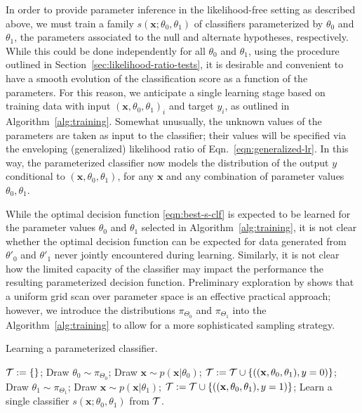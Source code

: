 \documentclass[12pt]{article}
\numberwithin{equation}{section}
\theoremstyle{plain}
\begin{document}
In order to provide parameter inference in the likelihood-free setting as
described above, we must train a family $s(\mathbf{x};\theta_0,\theta_1)$ of
classifiers parameterized by $\theta_0$ and $\theta_1$, the parameters
associated to the null and alternate hypotheses, respectively. While this could
be done independently for all $\theta_0$ and $\theta_1$, using the procedure
outlined in Section~\ref{sec:likelihood-ratio-tests}, it is desirable and
convenient to have a smooth evolution of the classification score as a function
of the parameters. For this reason, we anticipate a single learning stage based
on training data with input $(\mathbf{x}, \theta_0, \theta_1)_i$ and target
$y_i$, as outlined in Algorithm~\ref{alg:training}. Somewhat unusually, the
unknown values of the parameters are taken as input to the classifier; their
values will be specified via the enveloping (generalized) likelihood ratio of
Eqn.~\ref{eqn:generalized-lr}.  In this way, the parameterized classifier
now models the distribution of the output $y$ conditional to $(\mathbf{x}, \theta_0, \theta_1)$,
for any $\mathbf{x}$ and any combination of parameter values $\theta_0, \theta_1$.

While the optimal decision function \ref{eqn:best-s-clf} is expected to be
learned for the parameter values $\theta_0$ and $\theta_1$ selected in
Algorithm~\ref{alg:training}, it is not clear whether the optimal decision
function can be expected for data generated from  $\theta'_0$ and $\theta'_1$
never jointly encountered during learning. Similarly, it is not clear how the
limited capacity of the classifier may impact the performance the resulting
parameterized decision function.
Preliminary exploration by \cite{Baldi:2016fzo} shows that
 a uniform grid scan over parameter space is an effective practical approach;
 however, we introduce the distributions $\pi_{\Theta_0}$ and $\pi_{\Theta_1}$
into the Algorithm~\ref{alg:training} to allow for a more
 sophisticated sampling strategy.


\begin{algorithm}[t]
\caption{Learning a parameterized classifier.}\label{alg:training}
\begin{algorithmic}
    \State ${\cal T := \{ \}}$;
        \State Draw $\theta_0 \sim \pi_{\Theta_0}$;
	    \State Draw $\mathbf{x} \sim p(\mathbf{x}|\theta_0)$;
		\State ${\cal T} := {\cal T} \cup \{ ((\mathbf{x}, \theta_0, \theta_1), y=0) \}$;
        \State Draw $\theta_1 \sim \pi_{\Theta_1}$;
		\State Draw $\mathbf{x} \sim p(\mathbf{x}|\theta_1)$;
		\State ${\cal T} := {\cal T} \cup \{ ((\mathbf{x}, \theta_0, \theta_1), y=1) \}$;
    \EndWhile
    \State Learn a single classifier $s(\mathbf{x}; \theta_0, \theta_1)$ from ${\cal T}$.
\end{algorithmic}
\end{algorithm}
\end{document}
